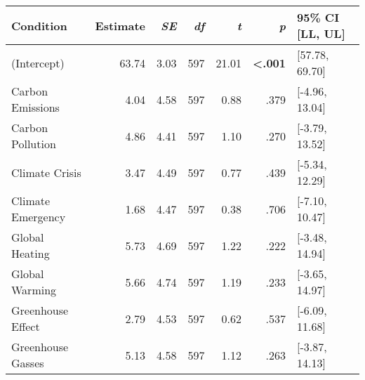 \begin{table}[ht]
\centering
\begin{tabular}{lrrrrrl}
  \hline
Condition & Estimate & \textit{SE} & \textit{df} & \textit{t} & \textit{p} & 95\% CI [LL, UL] \\ 
  \hline
(Intercept) & 63.74 & 3.03 & 597 & 21.01 & \textbf{\textless  .001} & [57.78, 69.70] \\ 
  Carbon Emissions & 4.04 & 4.58 & 597 & 0.88 & .379 & [-4.96, 13.04] \\ 
  Carbon Pollution & 4.86 & 4.41 & 597 & 1.10 & .270 & [-3.79, 13.52] \\ 
  Climate Crisis & 3.47 & 4.49 & 597 & 0.77 & .439 & [-5.34, 12.29] \\ 
  Climate Emergency & 1.68 & 4.47 & 597 & 0.38 & .706 & [-7.10, 10.47] \\ 
  Global Heating & 5.73 & 4.69 & 597 & 1.22 & .222 & [-3.48, 14.94] \\ 
  Global Warming & 5.66 & 4.74 & 597 & 1.19 & .233 & [-3.65, 14.97] \\ 
  Greenhouse Effect & 2.79 & 4.53 & 597 & 0.62 & .537 & [-6.09, 11.68] \\ 
  Greenhouse Gasses & 5.13 & 4.58 & 597 & 1.12 & .263 & [-3.87, 14.13] \\ 
   \hline
\end{tabular}
\end{table}
